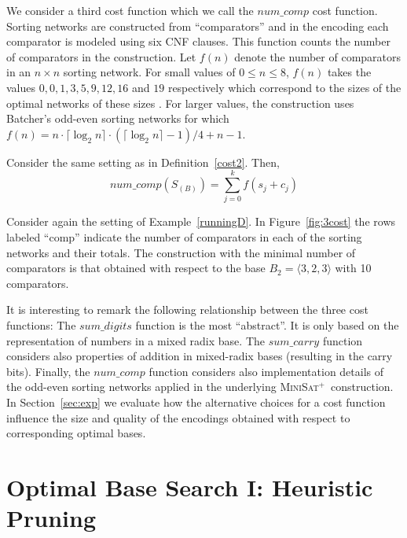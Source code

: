 \documentclass[envcountsame]{llncs}
\newcommand\tuple[1]{\langle #1 \rangle}
\newcommand\minisatp{\textsc{MiniSat$^+$}}
\newcommand{\sumCarry}{\mathit{sum\_carry}}
\newcommand{\sumDigits}{\mathit{sum\_digits}}
\newcommand{\numComparators}{\mathit{num\_comp}}
\newcommand{\ceil}[1]{\lceil{#1}\rceil}
\begin{document}
We consider a third cost function which we call the $\numComparators$
cost function.
Sorting networks are constructed from ``comparators'' \cite{Knuth73}
and in the encoding each comparator is modeled using six CNF clauses.
This function counts the number of comparators in the construction.
Let $f(n)$ denote the number of comparators in an $n\times n$ sorting
network. For small values of $0\leq n\leq 8$, $f(n)$ takes the values
$0, 0, 1, 3, 5, 9, 12, 16$ and $19$ respectively which correspond to
the sizes of the optimal networks of these sizes \cite{Knuth73}.  For
larger values, the construction uses Batcher's odd-even sorting
networks \cite{Batcher68} for which
$f(n)=n\cdot\ceil{\log_2n}\cdot(\ceil{\log_2n}-1)/4+n-1$.



\begin{definition}[cost function: $\numComparators$]
\label{num_comparators}
Consider the same setting as in Definition~\ref{cost2}.  Then,
\vspace{-7mm}
\[\numComparators(S_{(B)}) = \sum_{j=0}^{k} f(s_j+c_j)\]
\end{definition}

\vspace{-5mm}
\begin{example}
  Consider again the setting of Example~\ref{runningD}. 
In Figure~\ref{fig:3cost}  the rows labeled ``comp'' indicate the
  number of  comparators in each of the sorting networks and their
  totals. The construction with the minimal number of comparators is
  that obtained with respect to the base $B_2=\tuple{3,2,3}$ with 
  10 comparators.
\end{example}


It is interesting to remark the following relationship between the
three cost functions: The $\sumDigits$ function is the most
``abstract''. It is only based on the representation of numbers in a
mixed radix base.
The $\sumCarry$ function considers also properties of addition
in mixed-radix bases (resulting in the carry bits).
Finally, the $\numComparators$ function considers also implementation
details of the odd-even sorting networks applied in the underlying
\minisatp\ construction.
In Section~\ref{sec:exp} we evaluate how the alternative choices for a
cost function influence the size and quality of the encodings obtained
with respect to corresponding optimal bases.




\section{Optimal Base Search I: Heuristic Pruning}
\label{sec:ob1}
\end{document}
